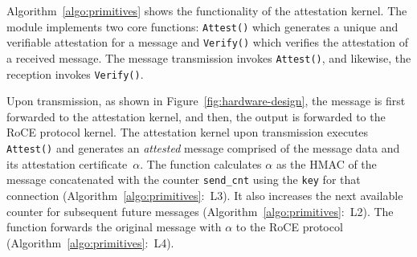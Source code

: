 Algorithm~\ref{algo:primitives} shows the functionality of the attestation kernel. The module implements two core functions: {\tt Attest()} which generates a unique and verifiable attestation for a message and {\tt Verify()} which verifies the attestation of a received message. The message transmission invokes {\tt Attest()}, and likewise, the reception invokes {\tt Verify()}. 

Upon transmission, as shown in Figure~\ref{fig:hardware-design}, the message is first forwarded to the attestation kernel, and then, the output is forwarded to the RoCE protocol kernel. 
The attestation kernel upon transmission executes \texttt{Attest()} and generates an {\em attested} message comprised of the message data and its attestation certificate~$\alpha$. The function calculates $\alpha$ as the HMAC of the message concatenated with the counter {\tt send\_cnt} using the {\tt key} for that connection (Algorithm~\ref{algo:primitives}:~L3). It also increases the next available counter for subsequent future messages (Algorithm~\ref{algo:primitives}:~L2). The function forwards the original message with $\alpha$ to the RoCE protocol (Algorithm~\ref{algo:primitives}:~L4).

